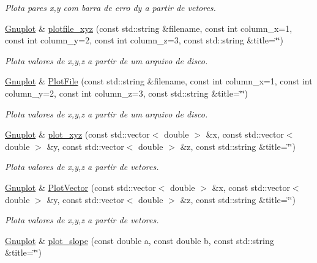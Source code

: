 \begin{DoxyCompactItemize}
\begin{DoxyCompactList}\small\item\em Plota pares x,y com barra de erro dy a partir de vetores. \end{DoxyCompactList}\item 
\hyperlink{class_gnuplot}{Gnuplot} \& \hyperlink{class_gnuplot_abd1c17c49fc59979a1143384c77c5b66}{plotfile\+\_\+xyz} (const std\+::string \&filename, const int column\+\_\+x=1, const int column\+\_\+y=2, const int column\+\_\+z=3, const std\+::string \&title=\char`\"{}\char`\"{})
\begin{DoxyCompactList}\small\item\em Plota valores de x,y,z a partir de um arquivo de disco. \end{DoxyCompactList}\item 
\hyperlink{class_gnuplot}{Gnuplot} \& \hyperlink{class_gnuplot_a3f5f7127182ea22da3ee0b78f0ade35c}{Plot\+File} (const std\+::string \&filename, const int column\+\_\+x=1, const int column\+\_\+y=2, const int column\+\_\+z=3, const std\+::string \&title=\char`\"{}\char`\"{})
\begin{DoxyCompactList}\small\item\em Plota valores de x,y,z a partir de um arquivo de disco. \end{DoxyCompactList}\item 
\hyperlink{class_gnuplot}{Gnuplot} \& \hyperlink{class_gnuplot_aee30f21a00a4f31c8356a2ef1f0e26e3}{plot\+\_\+xyz} (const std\+::vector$<$ double $>$ \&x, const std\+::vector$<$ double $>$ \&y, const std\+::vector$<$ double $>$ \&z, const std\+::string \&title=\char`\"{}\char`\"{})
\begin{DoxyCompactList}\small\item\em Plota valores de x,y,z a partir de vetores. \end{DoxyCompactList}\item 
\hyperlink{class_gnuplot}{Gnuplot} \& \hyperlink{class_gnuplot_a239b222cd7ff6ba4a60d583b22248a4f}{Plot\+Vector} (const std\+::vector$<$ double $>$ \&x, const std\+::vector$<$ double $>$ \&y, const std\+::vector$<$ double $>$ \&z, const std\+::string \&title=\char`\"{}\char`\"{})
\begin{DoxyCompactList}\small\item\em Plota valores de x,y,z a partir de vetores. \end{DoxyCompactList}\item 
\hyperlink{class_gnuplot}{Gnuplot} \& \hyperlink{class_gnuplot_a51ea5105eb87285820bb93910f8d346c}{plot\+\_\+slope} (const double a, const double b, const std\+::string \&title=\char`\"{}\char`\"{})

\end{DoxyCompactItemize}

